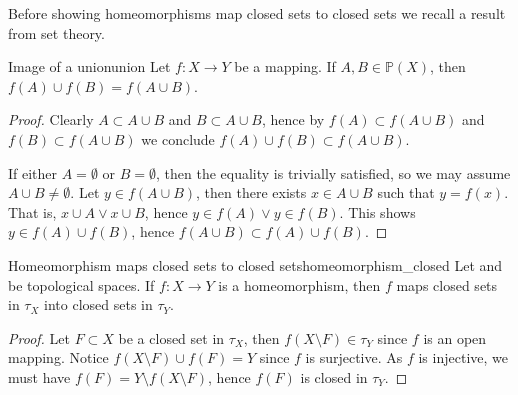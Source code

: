 Before showing homeomorphisms map closed sets to closed sets we recall a result from set theory.
\begin{lemma}{Image of a union}{union}
    Let \(f : X \to Y\) be a mapping. If \(A, B \in \mathbb{P}(X)\), then \(f(A) \cup f(B) = f(A \cup B)\).
\end{lemma}
\begin{proof}
    Clearly \(A \subset A\cup B\) and \(B \subset A\cup B\), hence by \(f(A) \subset f(A \cup B)\) and \(f(B) \subset f(A \cup B)\) we conclude \(f(A) \cup f(B) \subset f(A \cup B)\).

    If either \(A = \emptyset\) or \(B = \emptyset\), then the equality is trivially satisfied, so we may assume \(A \cup B \neq \emptyset\). Let \(y \in f(A \cup B)\), then there exists \(x \in A \cup B\) such that \(y = f(x)\). That is, \(x \cup A \lor x \cup B\), hence \(y \in f(A) \lor y \in f(B)\). This shows \(y \in f(A) \cup f(B)\), hence \(f(A \cup B) \subset f(A) \cup f(B)\).
\end{proof}

\begin{proposition}{Homeomorphism maps closed sets to closed sets}{homeomorphism_closed}
    Let  and  be topological spaces. If \(f : X \to Y\) is a homeomorphism, then \(f\) maps closed sets in \(\tau_X\) into closed sets in \(\tau_Y\).
\end{proposition}
\begin{proof}
    Let \(F\subset X\) be a closed set in \(\tau_X\), then \(f(X \setminus F) \in \tau_Y\) since \(f\) is an open mapping. Notice \(f(X \setminus F) \cup f(F) = Y\) since \(f\) is surjective. As \(f\) is injective, we must have \(f(F) = Y \setminus f(X\setminus F)\), hence \(f(F)\) is closed in \(\tau_Y\).
\end{proof}

